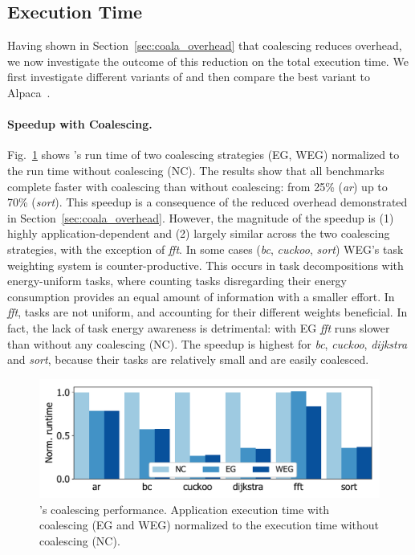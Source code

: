 \subsection{Execution Time}
\label{sec:result_coalescing}
%
Having shown in Section~\ref{sec:coala_overhead} that coalescing reduces
overhead, we now investigate the outcome of this reduction on the total
execution time. We first investigate different variants of \sys and
then compare the best variant to Alpaca~\cite{alpaca}.

\paragraph{Speedup with Coalescing.}

Fig.~\ref{fig:coalescing} shows \sys's run time of two coalescing
strategies (EG, WEG) normalized to the run time without coalescing (NC).
%
The results show that all benchmarks
complete faster with coalescing than without coalescing: from 25\%
(\textit{ar}) up to 70\% (\textit{sort}).
%
This speedup is a consequence of the reduced overhead demonstrated in
Section~\ref{sec:coala_overhead}.
%
However, the magnitude of the speedup is (1) highly application-dependent and
(2) largely similar across the two coalescing strategies, with the exception of
\textit{fft}.
%
In some cases (\textit{bc}, \textit{cuckoo}, \textit{sort}) WEG's task weighting
system is counter-productive.
%
This occurs in task decompositions with energy-uniform tasks, where counting
tasks disregarding their energy consumption provides an equal amount of information
with a smaller effort.
%
In \textit{fft}, tasks are not uniform, and accounting for their different weights
beneficial. In fact, the lack of task energy awareness is detrimental: with EG
\textit{fft} runs slower than without any coalescing (NC).
%
The speedup is highest for \textit{bc}, \textit{cuckoo}, \textit{dijkstra} and
\textit{sort}, because their tasks are relatively small and are easily coalesced.
%
\begin{figure}
    \includegraphics[width=.8\columnwidth]{figures/coalStrategies}%
    \caption{\sys's coalescing performance. Application execution time
with coalescing (EG and WEG) normalized to the execution time
without coalescing (NC).}
\label{fig:coalescing}
\end{figure}


